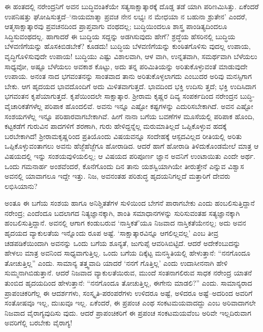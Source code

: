 ಈ ಹಂತದಲ್ಲಿ ನರೇಂದ್ರನಿಗೆ ಅವನ ಬುದ್ಧಿವಂತಿಕೆಯೇ ಸತ್ಯಸಾಕ್ಷಾತ್ಕಾರಕ್ಕೆ ದೊಡ್ಡ ತಡೆ ಯಾಗಿ ಪರಿಣಮಿಸಿತ್ತು. ಏಕೆಂದರೆ ಉಪನಿಷತ್ತು ಘೋಷಿಸುತ್ತದೆ–‘ನಾಯಮಾತ್ಮಾ ಪ್ರವಚ ನೇನ ಲಭ್ಯಃ ನ ಮೇಧಯಾ ನ ಬಹುನಾ ಶ್ರುತೇನ’ ಎಂದರೆ, ಆತ್ಮಸಾಕ್ಷಾತ್ಕಾರವು ಪ್ರವಚನದಿಂದ ಪ್ರಾಪ್ತವಾಗು ವಂಥದಲ್ಲ; ಬುದ್ಧಿಯಿಂದಲೂ ಶಾಸ್ತ್ರ ಪಾಂಡಿತ್ಯದಿಂದಲೂ ಸಿದ್ಧಿಸುವಂಥದಲ್ಲ. ಹಾಗಾದರೆ ಈ ಬುದ್ಧಿಯ ಸದ್ದನ್ನು ಅಡಗಿಸುವುದು ಹೇಗೆ? ಶ್ರದ್ಧೆಯ ಹೆಸರಿನಲ್ಲಿ ಬುದ್ಧಿಯ ಬೆಳವಣಿಗೆಯನ್ನು ಹೊಸಕಿಬಿಡಬೇಕೆ? ಕೂಡದು! ಬುದ್ಧಿಯ ಬೆಳವಣಿಗೆಯನ್ನು ಕುಂಠಿತಗೊಳಿಸು ವುದಲ್ಲ ಉಪಾಯ, ವೃದ್ಧಿಗೊಳಿಸುವುದೇ ಉಪಾಯ! ಬುದ್ಧಿಯು ಎಷ್ಟು ವಿಶಾಲವಾಗಿ, ಆಳ ವಾಗಿ, ಉನ್ನತವಾಗಿ, ಸಮರ್ಥವಾಗಿ ಬೆಳೆಯಲು ಸಾಧ್ಯವೋ, ಅಷ್ಟೂ ಬೆಳೆಯಲು ಅವಕಾಶ ಕೊಟ್ಟು, ಅದು ತನ್ನ ಪರಿಮಿತಿಯನ್ನು ಅರಿತುಕೊಳ್ಳುವಂತೆ ಮಾಡುವುದೇ ಉಪಾಯ. ಅನಂತ ನಾದ ಭಗವಂತನನ್ನು ಸಾಂತವಾದ ತಾನು ಅರಿತುಕೊಳ್ಳಲಾಗದು ಎಂಬುದರ ಅರಿವು ಮನಸ್ಸಿಗಾಗ ಬೇಕು. ಆಗ ಹೃದಯದ ಭಾವದೊಂದಿಗೆ ಅದು ಮಿಳಿತವಾಗುತ್ತದೆ. ಭಾವದಿಂದ ಭಕ್ತಿ ಉದಿಸು ತ್ತದೆ; ಭಕ್ತಿ ಉದಿಸಿದಾಗ ಭಗವಂತನ ಕೃಪೆಯಾಗುತ್ತದೆ. ಕೃಪೆಯಿಂದಲೇ ಸಾಕ್ಷಾತ್ಕಾರ. ಶ್ರೀರಾಮ ಕೃಷ್ಣರ ದಿವ್ಯ ಸಂಪರ್ಕದಿಂದ ನರೇಂದ್ರನ ಬುದ್ಧಿ-ವೈಚಾರಿಕತೆಗಳೆಲ್ಲ ಪರಿಪಾಕ ಹೊಂದಲಿವೆ. ಅವನು ಇನ್ನೂ ಎಷ್ಟೋ ಕಷ್ಟಗಳನ್ನು ಎದುರಿಸಬೇಕಾಗಿದೆ. ಅವನ ಎಷ್ಟೋ ಸಂಶಯಗಳೆಲ್ಲ ಇನ್ನೂ ಪರಿಹಾರವಾಗಬೇಕಾಗಿವೆ. ಹೀಗೆ ನಾನಾ ಬಗೆಯ ಬವಣೆಗಳ ಮೂಸೆಯಲ್ಲಿ ಪರಿಪಾಕ ಹೊಂದಿ, ಕಟ್ಟಕಡೆಗೆ ಗುರುವಿನ ಪಾದಗಳಿಗೆ ಶರಣಾಗಿ, ಗುರು ಹೇಳಿದ್ದನ್ನೆಲ್ಲ ಮರುಮಾತಿಲ್ಲದೆ ಒಪ್ಪಿಕೊಳ್ಳುವ ಹದಕ್ಕೆ ಬರಬೇಕಾಗಿದೆ! ಶ್ರೀರಾಮಕೃಷ್ಣರಿಂದ ಪ್ರತಿಯೊಂದು ವಿಷಯವನ್ನೂ ಸಂದೇಹಕ್ಕೆ ಆಸ್ಪದವಿಲ್ಲದ ರೀತಿಯಲ್ಲಿ ಅರಿತು ಒಪ್ಪಿಕೊಳ್ಳುವಂತಾಗಲು ಅವನು ಹೆಜ್ಜೆಹೆಜ್ಜೆಗೂ ಹೋರಾಡಿದ. ಆದರೆ ಹಾಗೆ ಹೋರಾಡಿ ತಿಳಿದುಕೊಂಡಮೇಲೆ ಮಾತ್ರ ಆ ವಿಷಯದಲ್ಲಿ ಇನ್ನು ಸಂಶಯವುಳಿಯಲಿಲ್ಲ; ಆ ವಿಷಯದ ಪರಿಪೂರ್ಣ ಜ್ಞಾನ ಅವನಿಗೆ ಉಂಟಾಯಿತು ಎಂದೇ ಅರ್ಥ. ಒಂದು ಗಮನಾರ್ಹ ಅಂಶವೆಂದರೆ, ಕೊನೆಗೊಂದು ದಿನ ತಾನು ಯಶಸ್ವಿಯಾಗಿಯೇ ತೀರುತ್ತೇನೆ ಎನ್ನುವ ವಿಶ್ವಾಸ ಅವನಲ್ಲಿ ಯಾವಾಗಲೂ ಇದ್ದೇ ಇತ್ತು. ನಿಜ, ಅವನಂತಹ ಪರಿಶುದ್ಧ ಹೃದಯನಿಗಲ್ಲದೆ ಮತ್ತಾರಿಗೆ ದೇವರು ಲಭಿಸಿಯಾನು?

ಅಂತೂ ಈ ಬಗೆಯ ಸಂಶಯ ಹಾಗೂ ಅನಿಶ್ಚಿತತೆಗಳ ಸುಳಿಯಿಂದ ಬೇಗನೆ ಪಾರಾಗಬೇಕು ಎಂದು ಹಂಬಲಿಸುತ್ತಿದ್ದಾನೆ ನರೇಂದ್ರ; ಎಂದೆಂದೂ ಬದಲಾಗದ ನಿತ್ಯಜ್ಞಾನಕ್ಕಾಗಿ, ಶಾಂತಿ ಸಮಾಧಾನಗಳನ್ನು ಸುರಿಸುವಂತಹ ಸತ್ಯಜ್ಞಾನಕ್ಕಾಗಿ ಹಂಬಲಿಸುತ್ತಿದ್ದಾನೆ. ಅವನಲ್ಲಿ ಆಗಾಗ ಕಂಡುಬರುವ ‘ನಾಸ್ತಿಕತೆ’ಯೂ ನಿಜವಾದ ನಾಸ್ತಿಕತೆಯೇನಲ್ಲ; ಅದು ಅವನ ಹೃದಯದ ವ್ಯಾಕುಲತೆಯ ಇನ್ನೊಂದು ರೂಪ ಅಷ್ಟೆ. ‘ಸಾಕ್ಷಾತ್ಕಾರವಿನ್ನೂ ಆಗಲಿಲ್ಲವಲ್ಲ’ ಎಂಬ ತೀವ್ರ ಚಡಪಡಿಕೆಯಿಂದಾಗಿ ಅವನನ್ನು ಒಂದು ಬಗೆಯ ಶೂನ್ಯತೆ, ಜುಗುಪ್ಸೆ ಆವರಿಸಿಬಿಟ್ಟಿದೆ. ಆದರೆ ಅದೇಕೆಂಬುದನ್ನು ಹೇಳಲು ಮಾತ್ರ ಅವನಿಂದ ಸಾಧ್ಯವಾಗುತ್ತಿಲ್ಲ. ಒಂದು ಬಗೆಯ ದಿಕ್ಕೆಟ್ಟ ಮನಸ್ಥಿತಿಯಲ್ಲಿ ಹೇಳುತ್ತಾನೆ: “ನನಗೊಂದೂ ತೋಚುತ್ತಿಲ್ಲ” ಎಂದು. ಸಾಮಾನ್ಯ ತತ್ತ್ವವಾದಿ ಯಾದರೆ ‘ನನಗೆ ಗೊತ್ತಿಲ್ಲ’ ಎಂದು ಉದಾಸೀನನಾಗಿ ಹೇಳಿ ಸುಮ್ಮನಾಗಿಬಿಡುತ್ತಾನೆ. ಆದರೆ ನಿಜವಾದ ವ್ಯಾಕುಲತೆಯಿರುವ, ಮುಂದೆ ಸಂತನಾಗಲಿರುವ ಸಾಧಕ ನರೇಂದ್ರ ಯಾತನೆ ತುಂಬಿದ ಹೃದಯದಿಂದ ಹೇಳುತ್ತಾನೆ: “ನನಗೊಂದೂ ತೋಚುತ್ತಿಲ್ಲ, ಈಗೇನು ಮಾಡಲಿ?” ಎಂದು. ಸಾಮಾನ್ಯರಾದ ಪ್ರಾಪಂಚಿಕರಿಗೆಲ್ಲ ಈ ಆದರ್ಶಗಳು, ಸಂಸ್ಕೃತಿ-ಪರಂಪರೆಗಳು ಉಳಿದರೂ ಅಷ್ಟೆ, ಅಳಿದರೂ ಅಷ್ಟೆ–ಅದರಿಂದ ಅವರಿಗೆ ಸಂತೋಷವೂ ಇಲ್ಲ, ದುಃಖವೂ ಇಲ್ಲ. ಏಕೆಂದರೆ, ಈ ಪ್ರಪಂಚ ಎಂಥ ಸಂಕಟಮಯವಾದದ್ದು ಎಂಬ ಅರಿವಾದಾಗಲೇ ನಿಜವಾದ ವೈರಾಗ್ಯವುದಿಸು ವುದು. ಆದರೆ ಪ್ರಾಪಂಚಿಕರಿಗೆ ಈ ಪ್ರಪಂಚ ಸಂಕಟಮಯವೆಂಬ ಅರಿವೇ ಇಲ್ಲದಿರುವಾಗ ಅವರಿಗೆಲ್ಲಿ ಬರಬೇಕು ವೈರಾಗ್ಯ!

